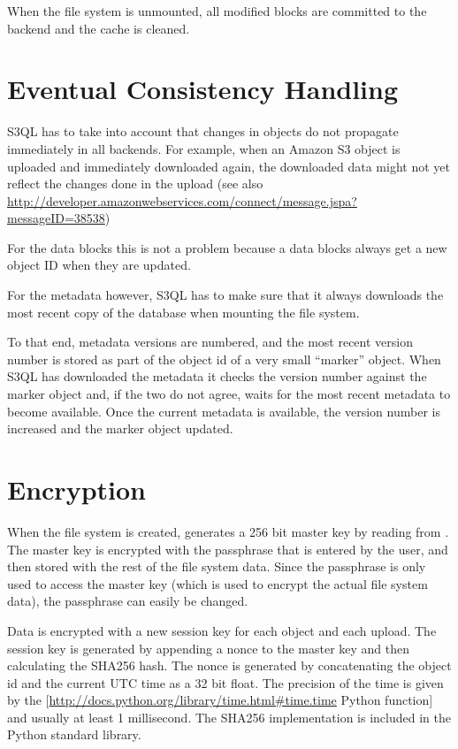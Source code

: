 \documentclass[letterpaper,10pt,english]{sphinxmanual}
\begin{document}
When the file system is unmounted, all modified blocks are committed
to the backend and the cache is cleaned.


\section{Eventual Consistency Handling}
\label{impl_details:eventual-consistency-handling}
S3QL has to take into account that changes in objects do not propagate
immediately in all backends. For example, when an Amazon S3 object is
uploaded and immediately downloaded again, the downloaded data might
not yet reflect the changes done in the upload (see also
\href{http://developer.amazonwebservices.com/connect/message.jspa?messageID=38538}{http://developer.amazonwebservices.com/connect/message.jspa?messageID=38538})

For the data blocks this is not a problem because a data blocks always
get a new object ID when they are updated.

For the metadata however, S3QL has to make sure that it always
downloads the most recent copy of the database when mounting the file
system.

To that end, metadata versions are numbered, and the most recent
version number is stored as part of the object id of a very small
``marker'' object. When S3QL has downloaded the metadata it checks the
version number against the marker object and, if the two do not agree,
waits for the most recent metadata to become available. Once the
current metadata is available, the version number is increased and the
marker object updated.


\section{Encryption}
\label{impl_details:encryption}
When the file system is created,  generates a 256 bit
master key by reading from . The master key is encrypted
with the passphrase that is entered by the user, and then stored with
the rest of the file system data. Since the passphrase is only used to
access the master key (which is used to encrypt the actual file system
data), the passphrase can easily be changed.

Data is encrypted with a new session key for each object and each
upload. The session key is generated by appending a nonce to the
master key and then calculating the SHA256 hash. The nonce is
generated by concatenating the object id and the current UTC time as a
32 bit float. The precision of the time is given by the
{[}\href{http://docs.python.org/library/time.html\#time.time}{http://docs.python.org/library/time.html\#time.time} Python 
function{]} and usually at least 1 millisecond. The SHA256
implementation is included in the Python standard library.
\end{document}
